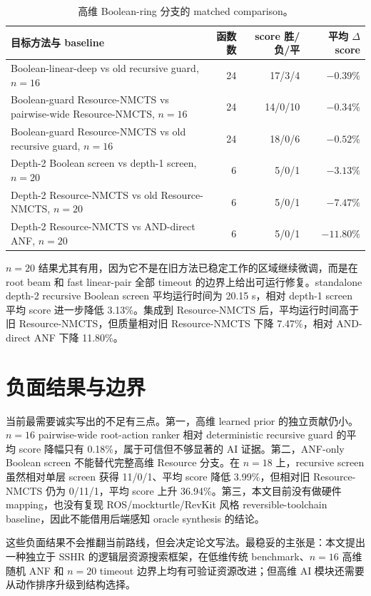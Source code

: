 \documentclass[UTF8,fontset=macnew,11pt]{ctexart}
\newcommand{\method}{Resource-NMCTS}
\begin{document}
\begin{table}[t]
\centering
\small
\caption{高维 Boolean-ring 分支的 matched comparison。}
\label{tab:highdim}
\begin{tabularx}{\linewidth}{>{\raggedright\arraybackslash}Xrrr}
\toprule
目标方法与 baseline & 函数数 & score 胜/负/平 & 平均 $\Delta$ score \\
\midrule
Boolean-linear-deep vs old recursive guard, $n=16$ & 24 & 17/3/4 & $-0.39\%$ \\
Boolean-guard \method{} vs pairwise-wide \method{}, $n=16$ & 24 & 14/0/10 & $-0.34\%$ \\
Boolean-guard \method{} vs old recursive guard, $n=16$ & 24 & 18/0/6 & $-0.52\%$ \\
Depth-2 Boolean screen vs depth-1 screen, $n=20$ & 6 & 5/0/1 & $-3.13\%$ \\
Depth-2 \method{} vs old \method{}, $n=20$ & 6 & 5/0/1 & $-7.47\%$ \\
Depth-2 \method{} vs AND-direct ANF, $n=20$ & 6 & 5/0/1 & $-11.80\%$ \\
\bottomrule
\end{tabularx}
\end{table}

$n=20$ 结果尤其有用，因为它不是在旧方法已稳定工作的区域继续微调，而是在 root beam 和 fast linear-pair 全部 timeout 的边界上给出可运行修复。standalone depth-2 recursive Boolean screen 平均运行时间为 20.15 s，相对 depth-1 screen 平均 score 进一步降低 3.13\%。集成到 \method{} 后，平均运行时间高于旧 \method{}，但质量相对旧 \method{} 下降 7.47\%，相对 AND-direct ANF 下降 11.80\%。

\section{负面结果与边界}

当前最需要诚实写出的不足有三点。第一，高维 learned prior 的独立贡献仍小。$n=16$ pairwise-wide root-action ranker 相对 deterministic recursive guard 的平均 score 降幅只有 0.18\%，属于可信但不够显著的 AI 证据。第二，ANF-only Boolean screen 不能替代完整高维 Resource 分支。在 $n=18$ 上，recursive screen 虽然相对单层 screen 获得 11/0/1、平均 score 降低 3.99\%，但相对旧 \method{} 仍为 0/11/1，平均 score 上升 36.94\%。第三，本文目前没有做硬件 mapping，也没有复现 ROS/mockturtle/RevKit 风格 reversible-toolchain baseline，因此不能借用后端感知 oracle synthesis 的结论\cite{meuli2020ros,yu2025backend}。

这些负面结果不会推翻当前路线，但会决定论文写法。最稳妥的主张是：本文提出一种独立于 SSHR 的逻辑层资源搜索框架，在低维传统 benchmark、$n=16$ 高维随机 ANF 和 $n=20$ timeout 边界上均有可验证资源改进；但高维 AI 模块还需要从动作排序升级到结构选择。
\end{document}
